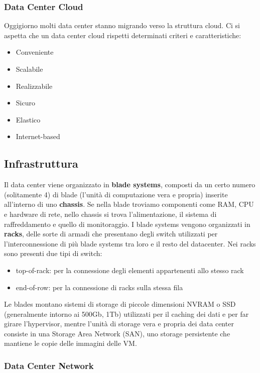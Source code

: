 \documentclass{article}
\providecommand{\tightlist}{%
		  \setlength{\itemsep}{0pt}\setlength{\parskip}{0pt}}
\begin{document}
		\subsubsection{Data Center Cloud}\label{data-center-cloud}
		Oggigiorno molti data center stanno migrando verso la struttura cloud. Ci si aspetta che un data center cloud rispetti determinati criteri e
		caratteristiche:
		\begin{itemize}
		\tightlist
		\item Conveniente
		\item Scalabile
		\item Realizzabile
		\item Sicuro
		\item Elastico
		\item Internet-based
		\end{itemize}
		\subsection{Infrastruttura}
		Il data center viene organizzato in \textbf{blade systems}, composti da un certo numero (solitamente 4) di blade (l'unità di computazione vera e propria) inserite all'interno di uno \textbf{chassis}. Se nella blade troviamo componenti come RAM, CPU e hardware di rete, nello chassis si trova l'alimentazione, il sistema di raffreddamento e quello di monitoraggio. I blade systems vengono organizzati in \textbf{racks}, delle sorte di armadi che presentano degli switch utilizzati per l'interconnessione di più blade systems tra loro e il resto del datacenter. Nei racks sono presenti due tipi di switch:
		\begin{itemize}
		\tightlist
		\item top-of-rack: per la connessione degli elementi appartenenti allo stesso rack
		\item end-of-row: per la connessione di racks sulla stessa fila
		\end{itemize}
		Le blades montano sistemi di storage di piccole	dimensioni NVRAM o SSD (generalmente intorno ai 500Gb,	1Tb) utilizzati per il caching dei dati e per far girare l'hypervisor, mentre l'unità di storage vera e propria dei data center consiste in una Storage Area Network (SAN), uno storage persistente che
		mantiene le copie delle immagini delle VM.
		
		\subsubsection{Data Center Network}\label{data-center-network}
\end{document}
